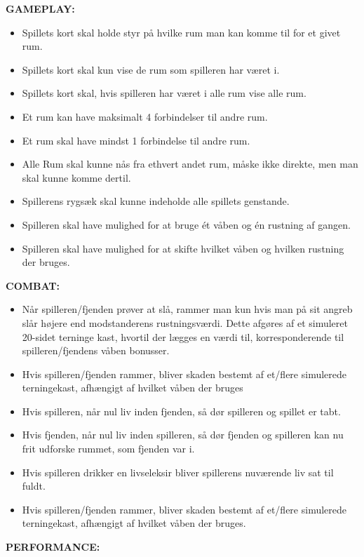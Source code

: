 \textbf{GAMEPLAY:}
\begin{itemize}
\item Spillets kort skal holde styr på hvilke rum man kan komme til for et givet rum.
\item Spillets kort skal kun vise de rum som spilleren har været i.
\item Spillets kort skal, hvis spilleren har været i alle rum vise alle rum.
\item Et rum kan have maksimalt 4 forbindelser til andre rum.
\item Et rum skal have mindst 1 forbindelse til andre rum.
\item Alle Rum skal kunne nås fra ethvert andet rum, måske ikke direkte, men man skal kunne komme dertil.
\item Spillerens rygsæk skal kunne indeholde alle spillets genstande.
\item Spilleren skal have mulighed for at bruge ét våben og én rustning af gangen.
\item Spilleren skal have mulighed for at skifte hvilket våben og hvilken rustning der bruges.

\end{itemize}
    
\textbf{COMBAT:}

\begin{itemize}
\item Når spilleren/fjenden prøver at slå, rammer man kun hvis man på sit angreb slår højere end modstanderens rustningsværdi. Dette afgøres af et simuleret 20-sidet terninge kast, hvortil der lægges en værdi til, korresponderende til spilleren/fjendens våben bonusser.
\item Hvis spilleren/fjenden rammer, bliver skaden bestemt af et/flere simulerede terningekast, afhængigt af hvilket våben der bruges
\item Hvis spilleren, når nul liv inden fjenden, så dør spilleren og spillet er tabt.
\item Hvis fjenden, når nul liv inden spilleren, så dør fjenden og spilleren kan nu frit udforske rummet, som fjenden var i.
\item Hvis spilleren drikker en livseleksir bliver spillerens nuværende liv sat til fuldt.
\item Hvis spilleren/fjenden rammer, bliver skaden bestemt af et/flere simulerede terningekast, afhængigt af hvilket våben der bruges.
\end{itemize}

\textbf{PERFORMANCE:}    

